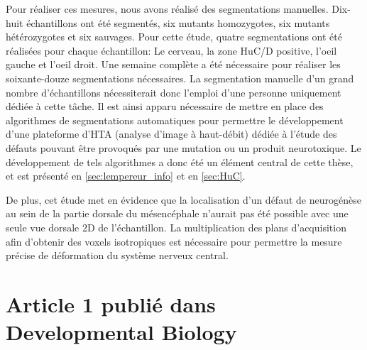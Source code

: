 \documentclass[\main/main.tex]{subfiles}
\begin{document}
%
Pour réaliser ces mesures, nous avons réalisé des segmentations manuelles.
%
Dix-huit échantillons ont été segmentés,
six mutants homozygotes, six mutants hétérozygotes et six sauvages.
%
Pour cette étude, quatre segmentations ont été réalisées pour chaque échantillon:
Le cerveau, la zone HuC/D positive, l'oeil gauche et l'oeil droit.
%
Une semaine complète a été nécessaire pour réaliser les soixante-douze segmentations nécessaires.
%
La segmentation manuelle d'un grand nombre d'échantillons
nécessiterait donc l'emploi d'une personne uniquement dédiée à cette tâche.
%
Il est ainsi apparu nécessaire de mettre en place des algorithmes de segmentations automatiques
pour permettre le développement d'une plateforme d'HTA (analyse d'image à haut-débit) dédiée à l'étude
des défauts pouvant être provoqués par une mutation ou un produit neurotoxique.
%
Le développement de tels algorithmes a donc été un élément central de cette thèse, et est présenté en \autoref{sec:lempereur_info} et en \autoref{sec:HuC}.

De plus, cet étude met en évidence que la localisation d'un défaut de neurogénèse au sein de la partie dorsale du
mésencéphale n'aurait pas été possible avec une seule vue dorsale 2D de l'échantillon.
%
La multiplication des plans d'acquisition  afin d'obtenir des voxels isotropiques est nécessaire
pour permettre la mesure précise de déformation du système nerveux central.

\section{Article 1 publié dans Developmental Biology}


\end{document}
